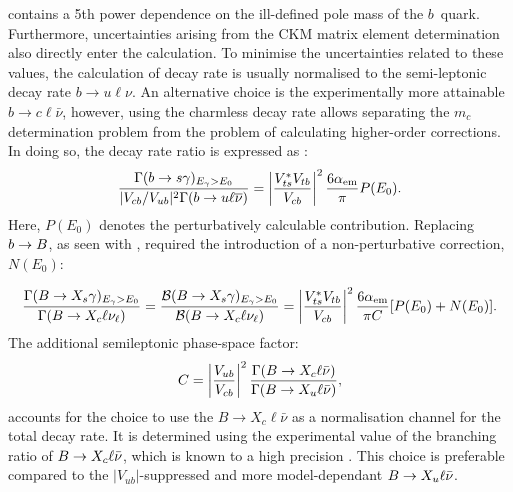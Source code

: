  contains a 5th power dependence on the ill-defined pole mass of the $b$~quark.
Furthermore, uncertainties arising from the CKM matrix element determination also directly enter the calculation.
To minimise the uncertainties related to these values, the calculation of \btosgamma decay rate is usually normalised to the semi-leptonic decay rate $b\rightarrow u\ell\nu$.
An alternative choice is the experimentally more attainable $b\rightarrow c\ell\bar{\nu}$, 
however, using the charmless decay rate allows separating the $m_c$ determination problem from the problem of calculating higher-order corrections.
In doing so, the decay rate ratio is expressed as \cite{Gambino:2001ew}:
\begin{equation}
    \frac{\Gamma(b\rightarrow s\gamma)_{{E_{\gamma}}>E_0}}{|V_{cb}/V_{ub}|^2 \Gamma(b\rightarrow u \ell\overline{\nu})} = \left|\frac{V_{ts}^*V_{tb}}{V_{cb}}\right|^2 \frac{6\alpha_{\mathrm{em}}}{\pi}P(E_0).
\end{equation}
Here, $P(E_0)$ denotes the perturbatively calculable contribution. 
Replacing $b\rightarrow B$, as seen with , required the introduction of a non-perturbative correction, $N(E_0)$:

\begin{equation}\label{eq:normalised_br}
    \frac{\Gamma(\BtoXsgamma)_{\Egamma>E_0}}{\Gamma(\B\to X_c\ell\nu_\ell)} = \frac{\mathcal{B}(\BtoXsgamma)_{\Egamma>E_0}}{\mathcal{B}(\B\to X_c\ell\nu_\ell)} = \left|\frac{V_{ts}^*V_{tb}}{V_{cb}}\right|^2\frac{6\alpha_{\mathrm{em}}}{\pi C}[P(E_0)+N(E_0)].
\end{equation}
The additional semileptonic phase-space factor:
\begin{equation}
    C = \left|\frac{V_{ub}}{V_{cb}}\right|^2 \frac{\Gamma(B\rightarrow X_c\ell\bar{\nu})}{\Gamma(B\rightarrow X_u\ell\bar{\nu})},
\end{equation}  
accounts for the choice to use the $B\rightarrow X_c\ell\bar{\nu}$ as a normalisation channel for the total decay rate. 
It is determined using the experimental value of the branching ratio of $B\rightarrow X_c \ell\bar{\nu}$, which is known to a high precision \cite{Alberti:2014yda,Workman:2022ynf}.
This choice is preferable compared to the \mbox{$|V_{ub}|$-suppressed} and more model-dependant $B\rightarrow X_u\ell\bar{\nu}$.

